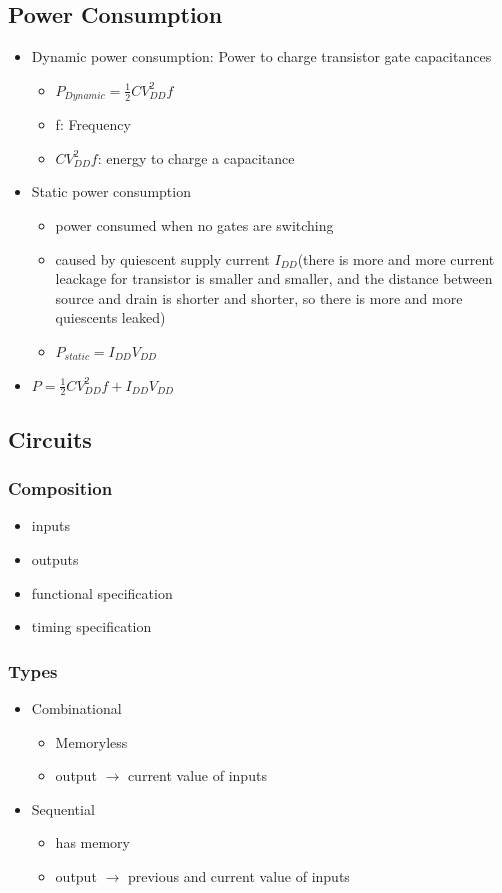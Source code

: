 \documentclass[12pt]{article}
\begin{document}
\subsection{Power Consumption}
\begin{itemize}
    \item Dynamic power consumption: Power to charge transistor gate capacitances \begin{itemize}
        \item $P_{Dynamic} = \frac{1}{2}CV_{DD}^2f$
        \item f: Frequency
        \item $CV_{DD}^2f$: energy to charge a capacitance
    \end{itemize}
    \item Static power consumption \begin{itemize}
        \item power consumed when no gates are switching
        \item caused by quiescent supply current $I_{DD}$(there is more and more current leackage for transistor is smaller and smaller, and the distance between source and drain is shorter and shorter, so there is more and more quiescents leaked)
        \item $P_{static} = I_{DD}V_{DD}$
    \end{itemize}
    \item $P = \frac{1}{2}CV_{DD}^2f + I_{DD}V_{DD}$
\end{itemize}
\subsection{Circuits}
\subsubsection{Composition}
\begin{itemize}
    \item inputs
    \item outputs
    \item functional specification
    \item timing specification
\end{itemize}
\subsubsection{Types}
\begin{itemize}
    \item Combinational \begin{itemize}
        \item Memoryless
        \item output $\to$ current value of inputs
    \end{itemize}
    \item Sequential \begin{itemize}
        \item has memory
        \item output $\to$ previous and current value of inputs
    \end{itemize}
\end{itemize}
\end{document}
